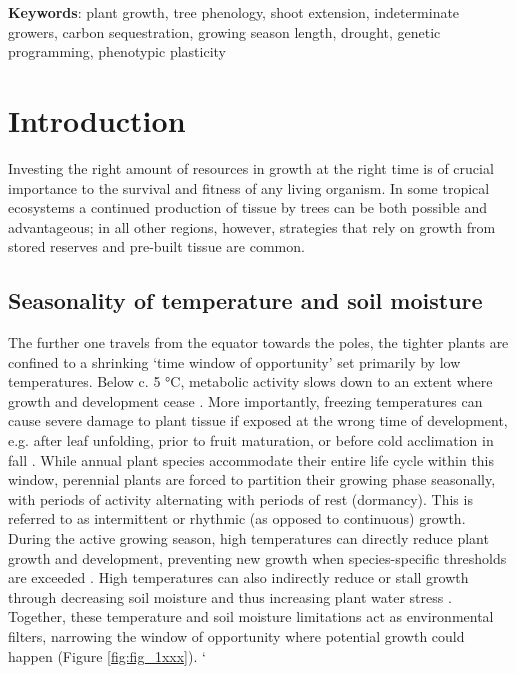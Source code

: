 \documentclass{article}
\begin{document}
			\textbf{Keywords}: plant growth, tree phenology, shoot extension, indeterminate growers, carbon sequestration, growing season length, drought, genetic programming, phenotypic plasticity
			\newpage
			
\section*{Introduction}
		Investing the right amount of resources in growth at the right time is of crucial importance to the survival and fitness of any living organism. In some tropical ecosystems a continued production of tissue by trees can be both possible and advantageous; in all other regions, however, strategies that rely on growth from stored reserves and pre-built tissue are common.

	\subsection*{Seasonality of temperature and soil moisture}
		The further one travels from the equator towards the poles, the tighter plants are confined to a shrinking `time window of opportunity' set primarily by low temperatures. Below c. 5 °C, metabolic activity slows down to an extent where growth and development cease  \citep{schenkerPhysiologicalMinimumTemperatures2014, rossiCriticalTemperaturesXylogenesis2008, kornerWinterCropGrowth2008}. More importantly, freezing temperatures can cause severe damage to plant tissue if exposed at the wrong time of development, e.g. after leaf unfolding, prior to fruit maturation, or before cold acclimation in fall \citep{sakaiFreezingInjuriesPlants1987c, baumgartenNoRiskNo2023a}. 
		While annual plant species accommodate their entire life cycle within this window, perennial plants are forced to partition their growing phase seasonally, with periods of activity alternating with periods of rest (dormancy). This is referred to as intermittent or rhythmic (as opposed to continuous) growth. \\

		During the active growing season, high temperatures can directly reduce plant growth and development, preventing new growth when species-specific thresholds are exceeded \citep{osullivanThermalLimitsLeaf2017}. High temperatures can also indirectly reduce or stall growth through decreasing soil moisture and thus increasing plant water stress \citep{hsiaoPlantResponsesWater1973, pugnaireConstraintsWaterStress1999, etzoldNumberGrowthDays2021}. Together, these temperature and soil moisture limitations act as environmental filters, narrowing the window of opportunity where potential growth could happen (Figure \ref{fig:fig_1xxx}).
		`
\end{document}
